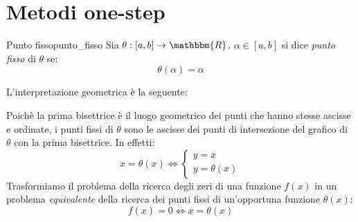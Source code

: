 \documentclass[12pt]{report}
\newcounter{definition}
\newcommand{\nmu}{}
\begin{document}
\section{Metodi one-step}
\begin{definition}{\nmu Punto fisso}{punto_fisso}
	Sia $\theta : [a, b] \to \mathbbm{R}$. $\alpha \in [a, b]$ si dice \textit{punto fisso} di $\theta$ se:
	\[
	\theta(\alpha) = \alpha
	\]
\end{definition}
L'interpretazione geometrica è la seguente:
\begin{center}
\end{center}
Poichè la prima bisettrice è il luogo geometrico dei punti che hanno stesse ascisse e ordinate, i punti fissi di $\theta$ sono le ascisse dei punti di intersezione del grafico di $\theta$ con la prima bisettrice. In effetti:
\[
x = \theta(x) \iff \begin{cases}
	y = x \\
	y = \theta(x)
\end{cases}
\]
Trasformiamo il problema della ricerca degli zeri di una funzione $f(x)$ in un problema \textit{equivalente} della ricerca dei punti fissi di un'opportuna funzione $\theta(x)$:
\[
f(x) = 0 \iff x = \theta(x)
\]
\end{document}
